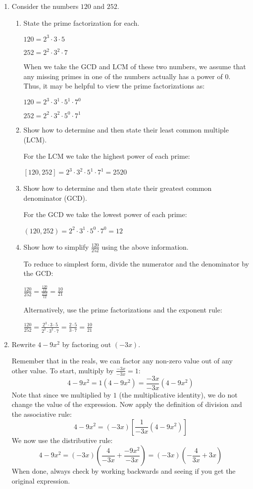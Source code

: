 \documentclass[letterpaper,12pt,fleqn]{article}
\begin{document}
\begin{enumerate}
\vspace{0.5in}

\item Consider the numbers $120$ and $252$.
  \begin{enumerate}
  \item State the prime factorization for each.

    $120=2^3\cdot3\cdot5$

    $252=2^2\cdot3^2\cdot7$

    When we take the GCD and LCM of these two numbers, we assume that any
    missing primes in one of the numbers actually has a power of $0$. Thus, it
    may be helpful to view the prime factorizations as:

    $120=2^3\cdot3^1\cdot5^1\cdot7^0$
    
    $252=2^2\cdot3^2\cdot5^0\cdot7^1$

  \item Show how to determine and then state their least common multiple (LCM).

    For the LCM we take the highest power of each prime:

    $[120,252]=2^3\cdot3^2\cdot5^1\cdot7^1=2520$

  \item Show how to determine and then state their greatest common denominator
    (GCD).

    For the GCD we take the lowest power of each prime:

    $(120,252)=2^2\cdot3^1\cdot5^0\cdot7^0=12$
    
  \item Show how to simplify $\frac{120}{252}$ using the above information.

    To reduce to simplest form, divide the numerator and the denominator by
    the GCD:

    $\frac{120}{252}=\frac{\frac{120}{12}}{\frac{252}{12}}=\frac{10}{21}$

    Alternatively, use the prime factorizations and the exponent rule:

    $\frac{120}{252}=\frac{2^3\cdot3\cdot5}{2^2\cdot3^2\cdot7}=
    \frac{2\cdot5}{3\cdot7}=\frac{10}{21}$
  \end{enumerate}

\vspace{0.5in}

\item Rewrite $4-9x^2$ by factoring out $(-3x)$.

  Remember that in the reals, we can factor any non-zero value out of any other
  value. To start, multiply by $\frac{-3x}{-3x}=1$:
  \[4-9x^2=1(4-9x^2)=\frac{-3x}{-3x}(4-9x^2)\]
  Note that since we multiplied by $1$ (the multiplicative identity), we do not
  change the value of the expression. Now apply the definition of division and
  the associative rule:
  \[4-9x^2=(-3x)\left[\frac{1}{-3x}(4-9x^2)\right]\]
  We now use the distributive rule:
  \[4-9x^2=(-3x)\left(\frac{4}{-3x}+\frac{-9x^2}{-3x}\right)=
  (-3x)\left(-\frac{4}{3x}+3x\right)\]
  When done, always check by working backwards and seeing if you get the
  original expression.


\end{enumerate}
\end{document}
